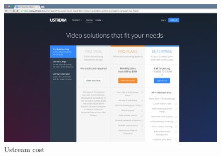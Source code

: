  \begin{figure}[htb]
 \centering
 \includegraphics[width=1.0\linewidth]{images/chapter3/ustream.png}\hfill
 \caption[Ustream cost]{Ustream cost}
 \label{fig:fourV}
\end{figure}